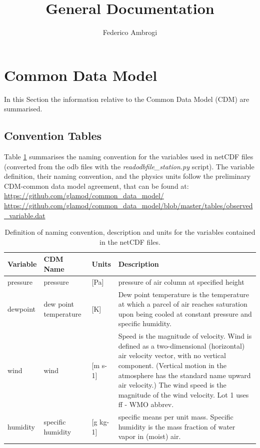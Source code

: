 \documentclass[a4paper,11pt]{article}
\author[a]{Federico Ambrogi}
\title{\boldmath General Documentation}
\begin{document}
 
	\sffamily
	\maketitle
	
	
	
\section{Common Data Model}
In this Section the information relative to the Common Data Model (CDM) are summarised.
\subsection{Convention Tables}
Table \ref{CDM} summarises the naming convention for the variables used in netCDF files (converted from the odb files with the \textit{readodbfile\_station.py} script).
The variable definition, their naming convention, and the physics units follow the preliminary CDM-common data model agreement, that can be found at:
\newline
\url{https://github.com/glamod/common_data_model/}
\newline
\url{https://github.com/glamod/common_data_model/blob/master/tables/observed_variable.dat}





\begin{table}[!htbp]
	\footnotesize
	\begin{center}
		\renewcommand{\arraystretch}{1.3}
		\begin{tabular}{ l l l p{3.5in}}
			\toprule
			\textbf{Variable} & \textbf{CDM Name} & \textbf{Units} & \textbf{Description}  \\ \toprule \toprule
			pressure & pressure & [Pa] & pressure of air column at specified height\\
			dewpoint & dew point temperature & [K] & Dew point temperature is the temperature at which a parcel of air reaches saturation upon being cooled at constant pressure and specific humidity.\\
			wind & wind & [m s-1] & Speed is the magnitude of velocity. Wind is defined as a two-dimensional (horizontal) air velocity vector,  with no vertical component. (Vertical motion in the atmosphere has the standard name upward air velocity.) The wind speed is the magnitude of the wind velocity. Lot 1 uses ff  - WMO abbrev.\\
			humidity & specific humidity & [g kg-1] & specific means per unit mass. Specific humidity is the mass fraction of water vapor in (moist) air.\\
			\bottomrule \bottomrule
		\end{tabular}
	\end{center}
	\caption{Definition of naming convention, description and units for the variables contained in the netCDF files.}
	\label{CDM}
\end{table}
\end{document}
